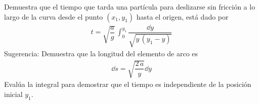 \begin{enumerate}
Demuestra que el tiempo que tarda una partícula para deslizarse sin fricción a lo largo de la curva desde el punto $(x_{1}, y_{1})$ hasta el origen, está dado por
\begin{align*}
t = \sqrt{\dfrac{a}{g}} \, \int_{0}^{y_{1}} \dfrac{\dd{y}}{\sqrt{y \, (y_{1}- y)}}
\end{align*}
Sugerencia: Demuestra que la longitud del elemento de arco es
\begin{align*}
\dd{s} = \sqrt{\dfrac{2 \, a}{y}} \dd{y}
\end{align*}
Evalúa la integral para demostrar que el tiempo es independiente de la posición inicial $y_{1}$.
\end{enumerate}
